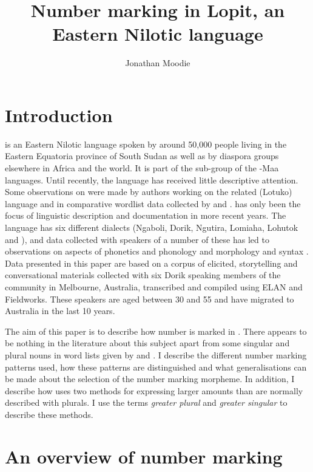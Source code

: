 \documentclass[output=paper]{langsci/langscibook}
\title{Number marking in Lopit, an Eastern Nilotic language}
\author{%
Jonathan Moodie \affiliation{University of Melbourne}
}
\begin{document}
\section{Introduction} \label{sec:moodie:1}
\largerpage
{} is an Eastern Nilotic language spoken by around 50,000 people living in the Eastern Equatoria province of South Sudan as well as by diaspora groups elsewhere in Africa and the world. It is part of the  sub-group of the -Maa languages. Until recently, the  language has received little descriptive attention. Some observations on  were made by authors working on the related  (Lotuko) language \citep{Muratori1938} and in comparative wordlist data collected by \citet{Driberg1932} and \citet{Vossen1982}.  has only been the focus of linguistic description and documentation in more recent years. The language has six different dialects (Ngaboli, Dorik, Ngutira, Lomiaha, Lohutok and ), and data collected with speakers of a number of these has led to observations on aspects of  phonetics and phonology \citep{Turner2001,Stirtz2014,Billington2014} and morphology and syntax \citep[e.g.][]{Laduetal2014}. Data presented in this paper are based on a corpus of elicited, storytelling and conversational materials collected with six Dorik speaking members of the  community in Melbourne, Australia, transcribed and compiled using ELAN and Fieldworks. These speakers are aged between 30 and 55 and have migrated to Australia in the last 10 years.

The aim of this paper is to describe how number is marked in . There appears to be nothing in the literature about this subject apart from some singular and plural nouns in word lists given by \citet{Driberg1932} and \citet{Vossen1982}. I describe the different number marking patterns used, how these patterns are distinguished and what generalisations can be made about the selection of the number marking morpheme. In addition, I describe how  uses two methods for expressing larger amounts than are normally described with plurals. I use the terms \textit{greater plural} and \textit{greater singular} to describe these methods. 

\section{An overview of number marking}\label{sec:moodie:2}
\end{document}
